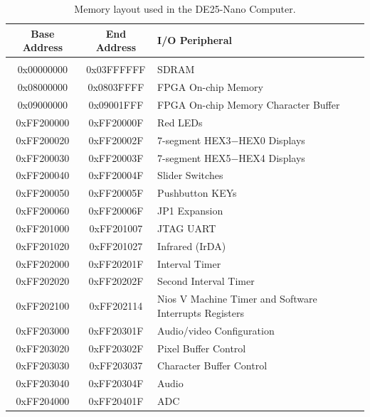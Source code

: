 \documentclass[11pt, twoside, pdftex]{article}
\newcommand{\systemName}{DE25-Nano Computer}
\begin{document}
\begin{table}[h]
    \begin{center}
    \begin{tabular}{c|c|l}
            \textbf{Base Address}
            & \textbf{End Address}
            & \textbf{I/O Peripheral}
				\\\hline\vspace{-3mm}\\
            0x00000000
            & 0x03FFFFFF
            & SDRAM
        \\
            0x08000000
            & 0x0803FFFF
            & FPGA On-chip Memory
        \\
            0x09000000
            & 0x09001FFF
            & FPGA On-chip Memory Character Buffer
        \\
            0xFF200000
            & 0xFF20000F
            & Red LEDs
        \\
            0xFF200020
            & 0xFF20002F
            & 7-segment HEX3$-$HEX0 Displays
        \\
            0xFF200030
            & 0xFF20003F
            & 7-segment HEX5$-$HEX4 Displays

        \\
            0xFF200040
            & 0xFF20004F
            & Slider Switches
        \\
            0xFF200050
            & 0xFF20005F
            & Pushbutton KEYs
        \\
            0xFF200060
            & 0xFF20006F
            & JP1 Expansion
        \\
            0xFF201000
            & 0xFF201007
            & JTAG UART
        \\
            0xFF201020
            & 0xFF201027
				& Infrared (IrDA)
        \\
            0xFF202000
            & 0xFF20201F
            & Interval Timer
        \\
            0xFF202020
            & 0xFF20202F
            & Second Interval Timer
        \\
            0xFF202100
            & 0xFF202114
            & Nios V Machine Timer and Software Interrupts Registers
        \\
            0xFF203000
            & 0xFF20301F
            & Audio/video Configuration
        \\
            0xFF203020
            & 0xFF20302F
            & Pixel Buffer Control
        \\
            0xFF203030
            & 0xFF203037
            & Character Buffer Control
        \\
            0xFF203040
            & 0xFF20304F
            & Audio
        \\
            0xFF204000
            & 0xFF20401F
            & ADC
        \\
    \end{tabular}
    \caption{Memory layout used in the \systemName.}
    \label{tab:memorylayout}
    \end{center}
\end{table}
\end{document}
